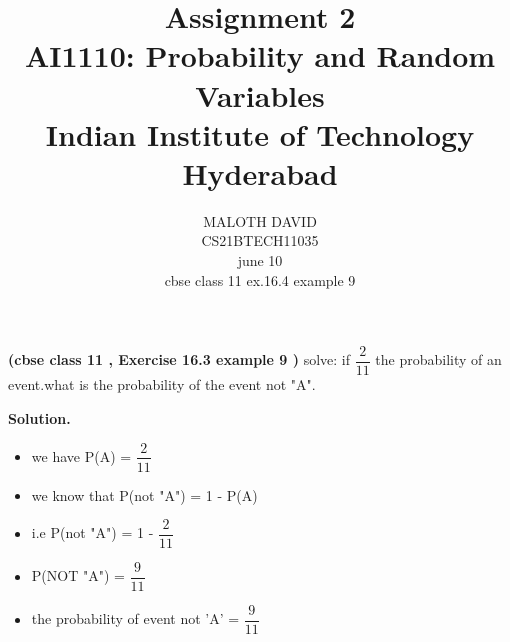 \documentclass[journal,12pt,twocolumn]{IEEEtran}
\title{Assignment 2 \\ \Large AI1110: Probability and Random Variables \\ \large Indian Institute of Technology Hyderabad}
\author{MALOTH DAVID \\ \normalsize CS21BTECH11035\\ \vspace*{20pt} \normalsize  june  10 \\ \vspace*{20pt} \Large cbse class 11 ex.16.4 example 9}
\begin{document}
	\maketitle
	
	\textbf{(cbse class 11  , Exercise 16.3 example 9 )}
	solve: if $\dfrac{2}{11}$ the probability of an event.what is the probability of the event not "A".
	
	\textbf{Solution.}		
\begin{itemize}

\item  we have P(A) = $\dfrac{2}{11}$

\item we know that P(not "A") = 1 - P(A)

\item i.e P(not "A") = 1 - $\dfrac{2}{11}$

\item  P(NOT "A") = $\dfrac{9}{11}$

\item the probability of event not 'A' = $\dfrac{9}{11}$

	\end{itemize}
	
	
\end{document}
